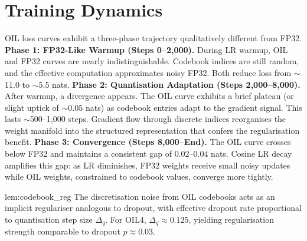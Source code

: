 \section{Training Dynamics}
\label{sec:training_dynamics}
OIL loss curves exhibit a three-phase trajectory qualitatively different from FP32.
\textbf{Phase 1: FP32-Like Warmup (Steps 0--2{,}000).} During LR warmup, OIL and FP32
curves are nearly indistinguishable. Codebook indices are still random, and the effective
computation approximates noisy FP32. Both reduce loss from $\sim$11.0 to $\sim$5.5 nats.
\textbf{Phase 2: Quantisation Adaptation (Steps 2{,}000--8{,}000).} After warmup, a
divergence appears. The OIL curve exhibits a brief plateau (or slight uptick of $\sim$0.05
nats) as codebook entries adapt to the gradient signal. This lasts $\sim$500--1{,}000 steps.
Gradient flow through discrete indices reorganises the weight manifold into the structured
representation that confers the regularisation benefit.
\textbf{Phase 3: Convergence (Steps 8{,}000--End).} The OIL curve crosses below FP32 and
maintains a consistent gap of $0.02$--$0.04$ nats. Cosine LR decay amplifies this gap: as
LR diminishes, FP32 weights receive small noisy updates while OIL weights, constrained to
codebook values, converge more tightly.
\begin{mylemma}{lem:codebook_reg}
The discretisation noise from OIL codebooks acts as an implicit regulariser analogous to
dropout, with effective dropout rate proportional to quantisation step size $\Delta_q$. For
OIL4, $\Delta_q \approx 0.125$, yielding regularisation strength comparable to dropout
$p \approx 0.03$.
\end{mylemma}
